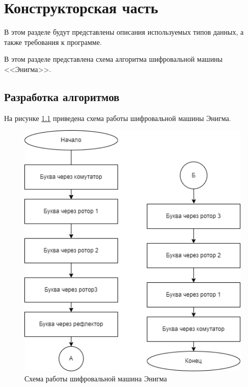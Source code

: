 \chapter{Конструкторская часть}
В этом разделе будут представлены описания используемых типов данных, а также требования к программе.

В этом разделе представлена схема алгоритма шифровальной машины <<Энигма>>.

\section{Разработка алгоритмов}

На рисунке \ref{fig:alg} приведена схема работы шифровальной машины Энигма.


\begin{figure}[ht!]
	\centering
	\includegraphics[width=0.5\linewidth]{img/enigma-algo.png}
	\caption{Схема работы шифровальной машина Энигма}
	\label{fig:alg}
\end{figure}




